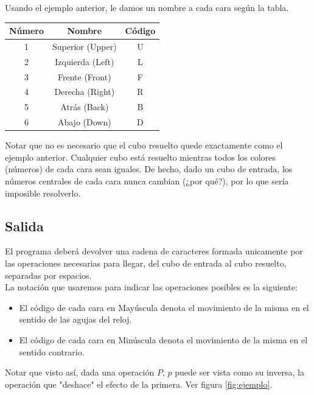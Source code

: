 \documentclass[11pt,a4paper]{article}
\begin{document}
Usando el ejemplo anterior, le damos un nombre a cada cara según la tabla. \\

\begin{center}
\begin{tabular}{| c || c | c |}
\hline 
Número & Nombre & Código \\ \hline
1 & Superior (Upper) & U \\ \hline
2 & Izquierda (Left) & L \\ \hline
3 & Frente (Front) & F \\ \hline
4 & Derecha (Right) & R \\ \hline
5 & Atrás (Back) & B \\ \hline
6 & Abajo (Down) & D \\ \hline
\end{tabular}
\end{center}


Notar que no es necesario que el cubo resuelto quede exactamente como el ejemplo anterior. Cualquier cubo está resuelto mientras todos los colores (números) de cada cara sean iguales. 
De hecho, dado un cubo de entrada, los números centrales de cada cara nunca cambian (¿por qué?), por lo que sería imposible resolverlo. %

\subsection{Salida}
El programa deberá devolver una cadena de caracteres formada unicamente por las operaciones necesarias para llegar, del cubo de entrada al cubo resuelto, separadas por espacios.\\
La notación que usaremos para indicar las operaciones posibles es la siguiente:
\begin{itemize}
\item El código de cada cara en Mayúscula denota el movimiento de la misma en el sentido de las agujas del reloj.
\item El código de cada cara en Minúscula denota el movimiento de la misma en el sentido contrario. 
\end{itemize}

Notar que visto así, dada una operación $P$, $p$ puede ser vista como su inversa, la operación que "deshace" el efecto de la primera. Ver figura \ref{fig:ejemplo}. \\
\end{document}
